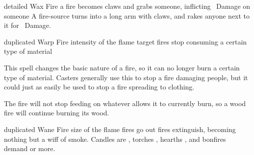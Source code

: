   {detailed}%
  {Wax}%
  {Fire}%
  {}%
  {a fire becomes claws and grabs someone, inflicting \showDam\ Damage on someone}%
  {
    A fire-source turns into a long arm with claws, and rakes anyone next to it for \showDam~Damage.
  }

  {duplicated}%
  {Warp}%
  {Fire}%
  {intensity of the flame}%
  {target fires stop consuming a certain type of material}%
  {
    This spell changes the basic nature of a fire, so it can no longer burn a certain type of material.
    Casters generally use this to stop a fire damaging people, but it could just as easily be used to stop a fire spreading to clothing.

    The fire will not stop feeding on whatever allows it to currently burn, so a wood fire will continue burning its wood.
  }

  {duplicated}%
  {Wane}%
  {Fire}%
  {size of the flame}%
  { fires go out}%
  {
     fires extinguish, becoming nothing but a wiff of smoke.
    Candles are \tn[6], torches \tn[7], hearths \tn[8], and bonfires demand \tn[9] or more.
  }
